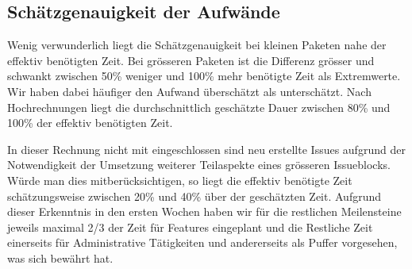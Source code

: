 	\subsection*{Schätzgenauigkeit der Aufwände}
	Wenig verwunderlich liegt die Schätzgenauigkeit bei kleinen Paketen nahe der effektiv benötigten Zeit.
	Bei grösseren Paketen ist die Differenz grösser und schwankt zwischen 50\% weniger und 100\% mehr benötigte Zeit als Extremwerte.
	Wir haben dabei häufiger den Aufwand überschätzt als unterschätzt.
	Nach Hochrechnungen liegt die durchschnittlich geschätzte Dauer zwischen 80\% und 100\% der effektiv benötigten Zeit.
	
	In dieser Rechnung nicht mit eingeschlossen sind neu erstellte Issues aufgrund der Notwendigkeit der Umsetzung weiterer Teilaspekte eines grösseren Issueblocks.
	Würde man dies mitberücksichtigen, so liegt die effektiv benötigte Zeit schätzungsweise zwischen 20\% und 40\% über der geschätzten Zeit.
	Aufgrund dieser Erkenntnis in den ersten Wochen haben wir für die restlichen Meilensteine jeweils maximal 2/3 der Zeit für Features eingeplant
	und die Restliche Zeit einerseits für Administrative Tätigkeiten und andererseits als Puffer vorgesehen, was sich bewährt hat. 
